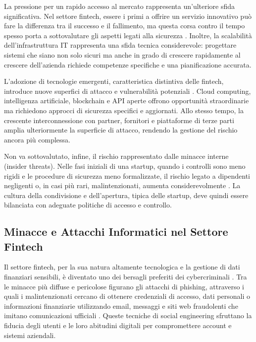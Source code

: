 \documentclass[a4paper,12pt]{report}
\begin{document}
La pressione per un rapido accesso al mercato rappresenta un'ulteriore sfida significativa. Nel settore fintech, essere i primi a offrire un servizio innovativo può fare la differenza tra il successo e il fallimento, ma questa corsa contro il tempo spesso porta a sottovalutare gli aspetti legati alla sicurezza \cite{fintechChallenges}. Inoltre, la scalabilità dell'infrastruttura IT rappresenta una sfida tecnica considerevole: progettare sistemi che siano non solo sicuri ma anche in grado di crescere rapidamente al crescere dell'azienda richiede competenze specifiche e una pianificazione accurata.

L'adozione di tecnologie emergenti, caratteristica distintiva delle fintech, introduce nuove superfici di attacco e vulnerabilità potenziali \cite{fintechChallenges}. Cloud computing, intelligenza artificiale, blockchain e API aperte offrono opportunità straordinarie ma richiedono approcci di sicurezza specifici e aggiornati. Allo stesso tempo, la crescente interconnessione con partner, fornitori e piattaforme di terze parti amplia ulteriormente la superficie di attacco, rendendo la gestione del rischio ancora più complessa.

Non va sottovalutato, infine, il rischio rappresentato dalle minacce interne (insider threats). Nelle fasi iniziali di una startup, quando i controlli sono meno rigidi e le procedure di sicurezza meno formalizzate, il rischio legato a dipendenti negligenti o, in casi più rari, malintenzionati, aumenta considerevolmente \cite{fintechChallenges}. La cultura della condivisione e dell'apertura, tipica delle startup, deve quindi essere bilanciata con adeguate politiche di accesso e controllo.

\subsection{Minacce e Attacchi Informatici nel Settore Fintech}

Il settore fintech, per la sua natura altamente tecnologica e la gestione di dati finanziari sensibili, è diventato uno dei bersagli preferiti dei cybercriminali \cite{cyberThreatsFintech}. Tra le minacce più diffuse e pericolose figurano gli attacchi di phishing, attraverso i quali i malintenzionati cercano di ottenere credenziali di accesso, dati personali o informazioni finanziarie utilizzando email, messaggi e siti web fraudolenti che imitano comunicazioni ufficiali \cite{cyberThreatsFintech}. Queste tecniche di social engineering sfruttano la fiducia degli utenti e le loro abitudini digitali per compromettere account e sistemi aziendali.
\end{document}
